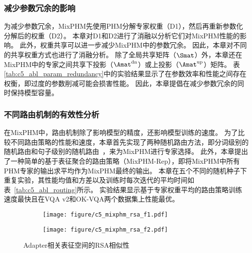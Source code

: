 


\subsubsection{减少参数冗余的影响}
为减少参数冗余，MixPHM先使用PHM分解专家权重（D1），然后再重新参数化分解后的权重（D2）。
本章对D1和D2进行了消融以分析它们对MixPHM性能的影响。
此外，权重共享可以进一步减少MixPHM中的参数冗余。
因此，本章对不同的共享权重方式也进行了消融分析。
除了全局共享矩阵（$\Smat$）外，本章还在MixPHM中的专家之间共享下投影（$\Amat^{\text{dn}}$）或上投影（$\Amat^{\text{up}}$）矩阵。
表\ref{tab:c5_abl_param_redundancy}中的实验结果显示了在参数效率和性能之间存在权衡，即过度的参数削减可能会损害性能。
因此，本章提倡在减少参数冗余的同时保持模型容量。


\subsubsection{不同路由机制的有效性分析}
在MixPHM中，路由机制除了影响模型的精度，还影响模型训练的速度。
为了比较不同路由策略的性能和速度，本章首先实现了两种随机路由方法，即分词级别的随机路由和句子级别的随机路由~\cite{fedus2021switch}，来为MixPHM进行专家选择。
此外，本章提出了一种简单的基于表征聚合的路由策略（MixPHM-Rep），即将MixPHM中所有PHM专家的输出求平均作为MixPHM最终的输出。
本章在五个不同的随机种子下重复实验，其性能均值和方差以及训练时每次迭代的平均时间如表~\ref{tab:c5_abl_routing}所示。
实验结果显示基于专家权重平均的路由策略训练速度最快且在VQA v2和OK-VQA两个数据集上性能最优。



\begin{figure}[!t]
\begin{subfigure}[b]{.48\linewidth}
\centering
\texttt{[image: figure/c5\_mixphm\_rsa\_f1.pdf]}
\end{subfigure}%
\hfill
\begin{subfigure}[b]{.48\linewidth}
\centering
\texttt{[image: figure/c5\_mixphm\_rsa\_f2.pdf]}
\end{subfigure}
\caption{Adapter相关表征空间的RSA相似性
}
\label{fig:mixphm_rsa}
\end{figure}

